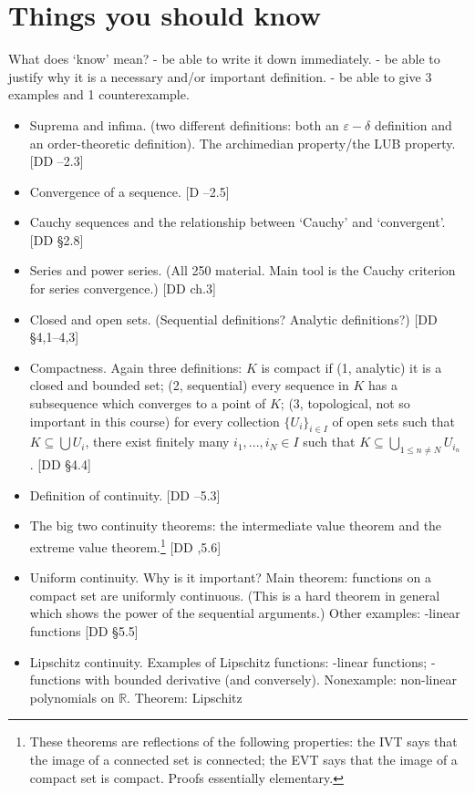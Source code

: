 \documentclass[a4paper,twoside]{article}
\newcommand{\R}{\mathbb{R}}
\begin{document}
  \section{Things you should know}
  What does `know' mean? - be able to write it down immediately. - be able to justify why it is a necessary and/or important definition. - be able to give 3 examples and 1 counterexample.
  \begin{itemize}
    \item Suprema and infima. (two different definitions: both an $ \varepsilon-\delta $ definition and an order-theoretic definition). The archimedian property/the LUB property. [DD --2.3]
    \item Convergence of a sequence. [D --2.5]
    \item Cauchy sequences and the relationship between `Cauchy' and `convergent'. [DD \S2.8]
    \item Series and power series. (All 250 material. Main tool is the Cauchy criterion for series convergence.) [DD ch.3]
    \item Closed and open sets. (Sequential definitions? Analytic definitions?) [DD \S4,1--4,3]
    \item Compactness. Again three definitions: $ K $ is compact if (1, analytic) it is a closed and bounded set; (2, sequential) every sequence in $ K $ has a subsequence which converges
          to a point of $ K $; (3, topological, not so important in this course) for every collection $ \{U_i\}_{i\in I} $ of open sets such that $ K \subseteq \bigcup U_i $, there exist finitely many $ i_1,...,i_N \in I $
          such that $ K \subseteq \bigcup_{1\leq n \neq N} U_{i_n} $ . [DD \S4.4]
    \item Definition of continuity. [DD --5.3]
    \item The big two continuity theorems: the intermediate value theorem and the extreme value theorem.\footnote{These theorems are reflections of the following properties: the
          IVT says that the image of a connected set is connected; the EVT says that the image of a compact set is compact. Proofs essentially elementary.} [DD ,5.6]
    \item Uniform continuity. Why is it important? Main theorem: functions on a compact set are uniformly continuous. (This is a hard theorem in general which shows the power of the sequential arguments.)
          Other examples: -linear functions [DD \S5.5]
    \item Lipschitz continuity. Examples of Lipschitz functions: -linear functions; -functions with bounded derivative (and conversely). Nonexample: non-linear polynomials on $ \R $. Theorem: Lipschitz

\end{itemize}
\end{document}
